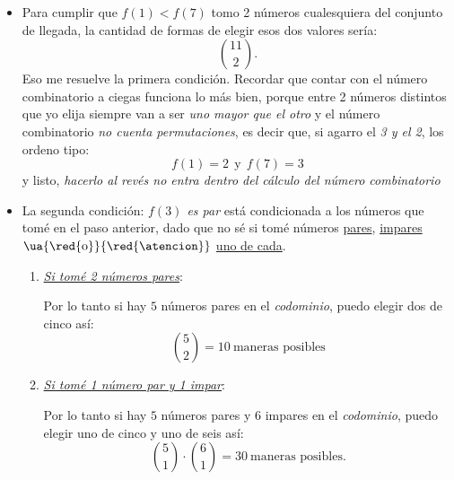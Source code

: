 \begin{itemize}
  \item Para cumplir que $f(1) < f(7)$ tomo 2 números cualesquiera del conjunto de llegada,
        la cantidad de formas de elegir esos dos valores sería:
        $$
          \binom{11}{2}.
        $$
        Eso me resuelve la primera condición. Recordar que contar con el número combinatorio
        a ciegas  funciona lo más bien, porque entre 2 números distintos que yo elija
        siempre van a ser \textit{uno mayor que el otro} y el número combinatorio
        \textit{no cuenta permutaciones}, es decir que, si agarro el \textit{3 y el 2}, los
        ordeno tipo:
        $$
          f(1) = 2 ~~\text{y} ~~ f(7) = 3
        $$
        y listo, \textit{hacerlo al revés no entra dentro del cálculo del número combinatorio}

  \item La segunda condición: \textit{$f(3)$ es par} está condicionada a los números que tomé
        en el paso anterior, dado que no sé si tomé números \ul{pares}, \ul{impares}
        $\ua{\red{\text{o}}}{\text{\red{\atencion}}}$
        \ul{uno de cada}.
        \begin{enumerate}[label=(\faIcon{calculator}$_{\arabic*}$)]
          \item
                \ul{\textit{Si tomé 2 números pares}}:

                Por lo tanto si hay $5$ números pares en el \textit{codominio}, puedo
                elegir dos de cinco así:
                $$
                  \binom{5}{2}  = 10 ~ \text{maneras posibles}
                $$

          \item
                \ul{\textit{Si tomé 1 número par y 1 impar}}:

                Por lo tanto si hay $5$ números pares y 6 impares en el \textit{codominio}, puedo
                elegir uno de cinco y uno de seis así:
                $$
                  \binom{5}{1} \cdot \binom{6}{1} = 30 ~ \text{maneras posibles}.
                $$


\end{enumerate}
\end{itemize}
